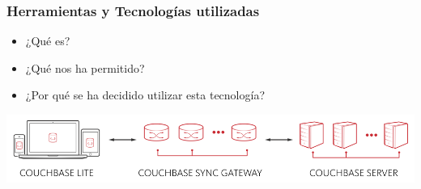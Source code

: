 \begin{frame}
\begin{columns}
\begin{column}{0.3\textwidth}
\begin{center}
					\end{center}
			\end{column}
		\end{columns}
	\endblock{}
\end{frame}

\begin{frame}
	\frametitle{Herramientas y Tecnologías utilizadas}
			\begin{itemize}
				\item {¿Qué es?}
				\item {¿Qué nos ha permitido?}
				\item {¿Por qué se ha decidido utilizar esta tecnología?}
			\end{itemize}
		\endblock{}
		\vfill 
			\begin{center}
				\includegraphics[width=1\linewidth]{Images/couchBase}
			\end{center}
\end{frame}

